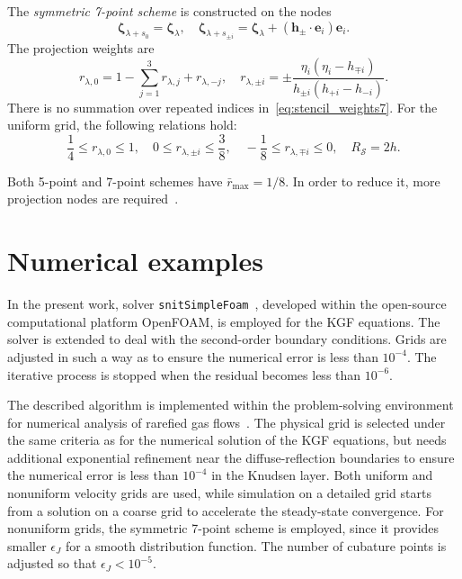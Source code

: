 \documentclass[10pt]{article}
\newcommand{\bzeta}{\boldsymbol{\zeta}}
\newcommand{\bh}{\boldsymbol{h}}
\newcommand{\be}{\boldsymbol{e}}
\begin{document}
The \emph{symmetric 7-point scheme} is constructed on the nodes
\begin{equation}\label{eq:stencil_nodes7}
    \bzeta_{\lambda+s_0} = \bzeta_{\lambda}, \quad
    \bzeta_{\lambda+s_{\pm i}} = \bzeta_{\lambda} + (\bh_\pm\cdot \be_i)\be_i.
\end{equation}
The projection weights are
\begin{equation}\label{eq:stencil_weights7}
    r_{\lambda,0} = 1 - \sum_{j=1}^3 r_{\lambda,j} + r_{\lambda,-j}, \quad
    r_{\lambda,\pm i} = \pm\frac{\eta_i(\eta_i - h_{\mp i})}{h_{\pm i}(h_{+i}-h_{-i})}.
\end{equation}
There is no summation over repeated indices in~\eqref{eq:stencil_weights7}.
For the uniform grid, the following relations hold:
\begin{equation}\label{eq:weights_ranges7}
    \frac14 \leq r_{\lambda,0} \leq 1, \quad
    0 \leq r_{\lambda,\pm i} \leq \frac38, \quad
    -\frac18 \leq r_{\lambda,\mp i} \leq 0, \quad
    R_\mathcal{S} = 2h.
\end{equation}

Both 5-point and 7-point schemes have \(\bar{r}_{\max}=1/8\).
In order to reduce it, more projection nodes are required~\cite{Dodulad2012}.

\section{Numerical examples}

In the present work, solver \verb+snitSimpleFoam+~\cite{Rogozin2014}, developed
within the open-source computational platform OpenFOAM\textregistered{}, is employed for the KGF equations.
The solver is extended to deal with the second-order boundary conditions.
Grids are adjusted in such a way as to ensure the numerical error is less than \(10^{-4}\).
The iterative process is stopped when the residual becomes less than \(10^{-6}\).

The described algorithm is implemented within the problem-solving environment
for numerical analysis of rarefied gas flows~\cite{Kloss2010, Kloss2012}.
The physical grid is selected under the same criteria as for the numerical solution of the KGF equations,
but needs additional exponential refinement near the diffuse-reflection boundaries
to ensure the numerical error is less than \(10^{-4}\) in the Knudsen layer.
Both uniform and nonuniform velocity grids are used, while simulation on a detailed grid
starts from a solution on a coarse grid to accelerate the steady-state convergence.
For nonuniform grids, the symmetric 7-point scheme is employed,
since it provides smaller \(\epsilon_J\) for a smooth distribution function.
The number of cubature points is adjusted so that \(\epsilon_J < 10^{-5}\).
\end{document}
